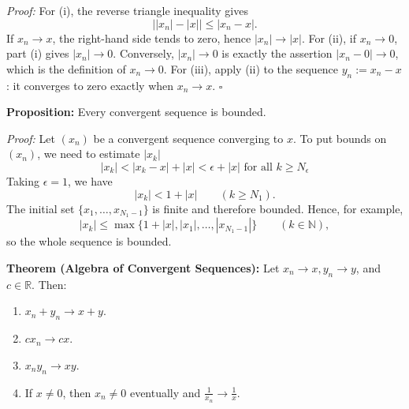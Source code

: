 \documentclass[a4paper,11pt,abstracton]{scrartcl}
\newcommand{\RR}{\mathbb{R}}
\newcommand{\NN}{\mathbb{N}}
\theoremstyle{dotlessP}
\theoremstyle{dotlessS}
\theoremstyle{remark}
\theoremstyle{definition}
\begin{document}
\begin{claim_box}
\textit{Proof:}
For (i), the reverse triangle inequality gives
\[
  \bigl||x_n|-|x|\bigr|\le |x_n-x|.
\]
If $x_n\to x$, the right-hand side tends to zero, hence $|x_n|\to|x|$.
For (ii), if $x_n\to0$, part (i) gives $|x_n|\to0$. Conversely,
$|x_n|\to0$ is exactly the assertion $|x_n-0|\to0$, which is the
definition of $x_n\to0$. For (iii), apply (ii) to the sequence
$y_n:=x_n-x$: it converges to zero exactly when $x_n\to x$.
\hfill$\square$
\end{claim_box}

\begin{problem_box}
\textbf{Proposition:}
Every convergent sequence is bounded.
\end{problem_box}

\begin{claim_box}
\textit{Proof:}
Let $(x_n)$ be a convergent sequence converging to $x$. To put bounds on $(x_n)$, we need to estimate $|x_k|$
$$ |x_k| < |x_k - x| + |x| < \epsilon + |x| \text{ for all } k \ge N_\epsilon $$
Taking $\epsilon=1$, we have
\[
 |x_k|<1+|x|\qquad(k\ge N_1).
\]
The initial set $\{x_1,\ldots,x_{N_1-1}\}$ is finite and therefore
bounded. Hence, for example,
\[
 |x_k|\le \max\{1+|x|,|x_1|,\ldots,|x_{N_1-1}|\}
 \qquad(k\in\NN),
\]
so the whole sequence is bounded.
\end{claim_box}

\begin{problem_box}
\textbf{Theorem (Algebra of Convergent Sequences):}
Let $x_n \rightarrow x, y_n \rightarrow y$, and $c \in \RR$. Then:
\begin{enumerate}
\item $x_n+y_n\rightarrow x+y$.
\item $cx_n\rightarrow cx$.
\item $x_ny_n\rightarrow xy$.
\item If $x\ne0$, then $x_n\ne0$ eventually and
$\frac{1}{x_n}\rightarrow\frac{1}{x}$.
\end{enumerate}
\end{problem_box}
\end{document}
